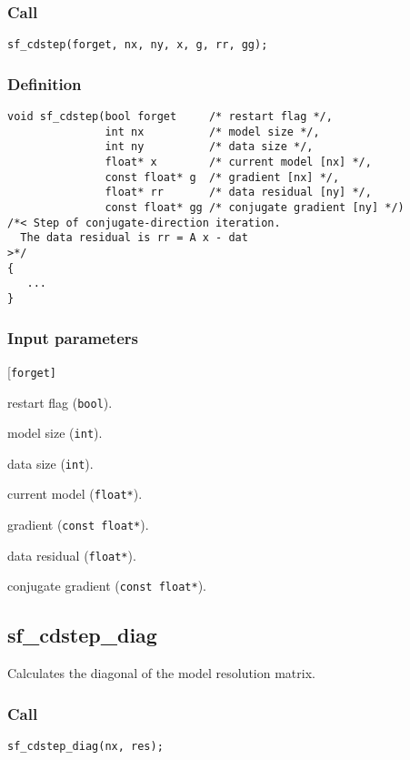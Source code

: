 \subsubsection*{Call}
\begin{verbatim}sf_cdstep(forget, nx, ny, x, g, rr, gg);\end{verbatim}

\subsubsection*{Definition}
\begin{verbatim}
void sf_cdstep(bool forget     /* restart flag */, 
               int nx          /* model size */, 
               int ny          /* data size */, 
               float* x        /* current model [nx] */, 
               const float* g  /* gradient [nx] */, 
               float* rr       /* data residual [ny] */, 
               const float* gg /* conjugate gradient [ny] */) 
/*< Step of conjugate-direction iteration. 
  The data residual is rr = A x - dat
>*/
{
   ...
}
\end{verbatim}

\subsubsection*{Input parameters}
\begin{desclist}{\tt }{\quad}[\tt forget]
   \setlength\itemsep{0pt}
   \item[forget] restart flag (\texttt{bool}).  
   \item[nx]     model size (\texttt{int}).  
   \item[ny]     data size (\texttt{int}).  
   \item[x]      current model (\texttt{float*}).  
   \item[g]      gradient (\texttt{const float*}).  
   \item[rr]     data residual (\texttt{float*}).
   \item[gg]     conjugate gradient (\texttt{const float*}).  
\end{desclist}




\subsection{{sf\_cdstep\_diag}}
Calculates the diagonal of the model resolution matrix.

\subsubsection*{Call}
\begin{verbatim}sf_cdstep_diag(nx, res);\end{verbatim}

